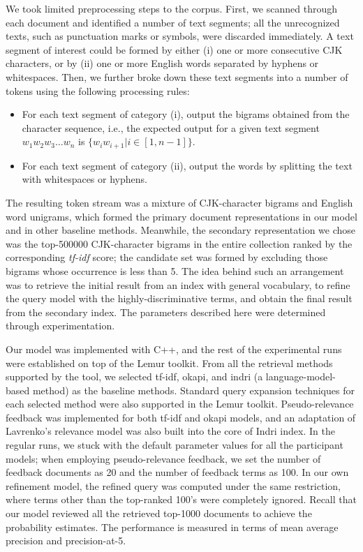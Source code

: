 We took limited preprocessing steps to the corpus.  First, we scanned
through each document and identified a number of text segments; all the
unrecognized texts, such as punctuation marks or symbols, were discarded
immediately.  A text segment of interest could be formed by either (i) one or more consecutive CJK
characters, or by (ii) one or more English words separated by hyphens or
whitespaces.  Then, we further broke down these text segments into a number of tokens
using the following processing rules:  \begin{itemize} \item For each text
segment of category (i), output the bigrams obtained from the character
sequence, i.e., the expected output for a given text segment $w_1 w_2 w_3
\ldots w_n$ is $\{ w_i w_{i+1} | i \in [1, n-1] \}$.  \item For each text
segment of category (ii), output the words by splitting the text with whitespaces or
hyphens.  \end{itemize} 

The resulting token stream was a mixture of CJK-character bigrams and English
word unigrams, which formed the primary document representations in our model
and in other baseline methods.  Meanwhile, the secondary representation we
chose was the top-500000 CJK-character bigrams in the entire collection ranked
by the corresponding \emph{tf-idf} score; the candidate set was formed by
excluding those bigrams whose occurrence is less than 5.  The idea behind such
an arrangement was to retrieve the initial result from an index with general
vocabulary, to refine the query model with the highly-discriminative terms, and
obtain the final result from the secondary index.  The parameters described
here were determined through experimentation.

Our model was implemented with C++, and the rest of the experimental runs were
established on top of the Lemur toolkit.  From all the retrieval methods
supported by the tool, we selected tf-idf, okapi, and indri (a
language-model-based method) as the baseline methods.  Standard query expansion
techniques for each selected method were also supported in the Lemur toolkit.
Pseudo-relevance feedback was implemented for both tf-idf and okapi models, and
an adaptation of Lavrenko's relevance model was also built into the core of
Indri index.  In the regular runs, we stuck with the default parameter values
{for} all the participant models; when employing pseudo-relevance feedback, we
set the number of feedback documents as 20 and the number of feedback terms as
100.  In our own refinement model, the refined query was computed under the
same restriction, where terms other than the top-ranked 100's were completely
ignored.  Recall that our model reviewed all the retrieved top-1000 documents
to achieve the probability estimates.  The performance is measured in terms of
mean average precision and precision-at-5.  

